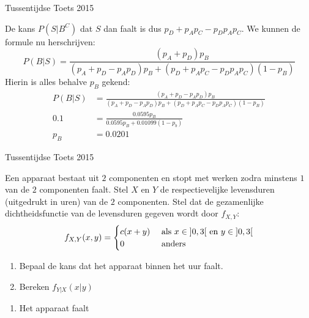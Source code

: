 \documentclass[main.tex]{subfiles}
\begin{document}
\begin{examenvraag}{Tussentijdse Toets 2015}
\begin{ex-antwoord}
\begin{itemize}
      De kans $P(S|B^{C})$ dat $S$ dan faalt is dus $p_{D} + p_{A}p_{C} - p_{D}p_{A}p_{C}$.
      We kunnen de formule nu herschrijven:
      \[ P(B|S) = \frac{(p_{A}+p_{D})p_{B}}{(p_{A}+p_{D}-p_{A}p_{D})p_{B} + (p_{D} + p_{A}p_{C} - p_{D}p_{A}p_{C})(1-p_{B})} \]
      Hierin is alles behalve $p_{B}$ gekend:
      \begin{align*}
        P(B|S) &= \frac{(p_{A}+p_{D}-p_{A}p_{D})p_{B}}{(p_{A}+p_{D}-p_{A}p_{D})p_{B} + (p_{D} + p_{A}p_{C} -p_{D}p_{A}p_{C})(1-p_{B})}\\
        0.1 &= \frac{0.0595 p_{B}}{ 0.0595 p_{B} + 0.01099(1-p_{b})}\\
        p_{B} &= 0.0201
      \end{align*}
    \end{itemize}
  \end{ex-antwoord}
\end{examenvraag}

\begin{examenvraag}{Tussentijdse Toets 2015}
  \begin{ex-vraag}
    Een apparaat bestaat uit $2$ componenten en stopt met werken zodra minstens $1$ van de $2$ componenten faalt.
    Stel $X$ en $Y$ de respectievelijke levensduren (uitgedrukt in uren) van de $2$ componenten.
    Stel dat de gezamenlijke dichtheidsfunctie van de levensduren gegeven wordt door $f_{X,Y}$:
    \[
    f_{X,Y}(x,y) = 
    \begin{cases}
      c(x+y) & \text{ als } x\in\interval[open]{0}{3} \text{ en } y \in\interval[open]{0}{3}\\
      0 & \text{ anders}
    \end{cases}
    \]
    \begin{enumerate}
    \item Bepaal de kans dat het apparaat binnen het uur faalt.
    \item Bereken $f_{Y|X}(x|y)$
    \end{enumerate}
  \end{ex-vraag}

  \begin{ex-antwoord}
    \begin{enumerate}
    \item Het apparaat faalt
    \end{enumerate}
  \end{ex-antwoord}
\end{examenvraag}
\end{document}
